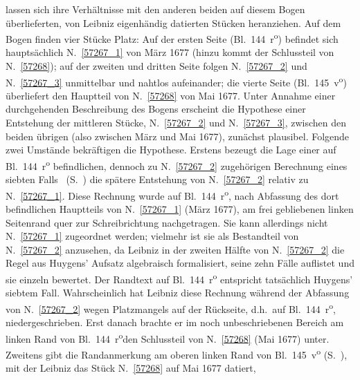 \begin{ledgroup}
%
lassen sich ihre Verhältnisse mit den anderen beiden auf diesem Bogen überlieferten, von Leibniz eigenhändig datierten Stücken heranziehen.
%
Auf dem Bogen finden vier Stücke Platz: 
%
Auf der ersten Seite (Bl.~144~r\textsuperscript{o}) befindet sich hauptsächlich N.~\ref{57267_1} von März 1677 (hinzu kommt der Schlussteil von N.~\ref{57268}); 
%
auf der zweiten und dritten Seite folgen N.~\ref{57267_2} und N.~\ref{57267_3} unmittelbar und nahtlos aufeinander; 
%
die vierte Seite (Bl.~145~v\textsuperscript{o}) überliefert den Hauptteil von N.~\ref{57268} von Mai 1677.
%
Unter Annahme einer durchgehenden Beschreibung des Bogens erscheint die Hypothese einer Entstehung der mittleren Stücke, N.~\ref{57267_2} und  N.~\ref{57267_3}, zwischen den beiden übrigen (also zwischen März und Mai 1677), zunächst plausibel. Folgende zwei Umstände bekräftigen die Hypothese.
%
\pend
%
\pstart
Erstens bezeugt die Lage einer auf Bl.~144~r\textsuperscript{o} befindlichen, dennoch zu N.~\ref{57267_2} zugehörigen
%
Berechnung eines \glqq siebten Falls\grqq\
%
(S.~) die spätere Entstehung von N.~\ref{57267_2} relativ zu N.~\ref{57267_1}.
%
Diese Rechnung wurde auf Bl.~144~r\textsuperscript{o}, nach Abfassung des dort befindlichen Hauptteils von N.~\ref{57267_1} (März 1677),
%
am frei gebliebenen linken Seitenrand quer zur Schreibrichtung nachgetragen. 
%
Sie kann allerdings nicht N.~\ref{57267_1} zugeordnet werden; vielmehr ist sie als Bestandteil von N.~\ref{57267_2} anzusehen, 
%
da Leibniz in der zweiten Hälfte von N.~\ref{57267_2}
%
die Regel aus \protect{}Huygens' \cite{00529}Aufsatz
%
algebraisch formalisiert, seine zehn Fälle auflistet und sie einzeln bewertet. Der Randtext auf Bl.~144~r\textsuperscript{o} entspricht tatsächlich 
%
\protect{}Huygens' siebtem Fall.
%
Wahrscheinlich hat Leibniz diese Rechnung während der Abfassung von N.~\ref{57267_2} wegen Platzmangels auf der Rückseite, d.h.\ auf Bl.~144~r\textsuperscript{o}, niedergeschrieben.
%
Erst danach brachte er im noch unbeschriebenen Bereich am linken Rand von Bl.~144~r\textsuperscript{o}den Schlussteil von N.~\ref{57268} (Mai 1677) unter.
%
\pend
%
\pstart
Zweitens gibt die Randanmerkung am oberen linken Rand von Bl.~145~v\textsuperscript{o} 
%
(S.~), 
%
mit der Leibniz das Stück N.~\ref{57268} auf Mai 1677 datiert, 

\end{ledgroup}
